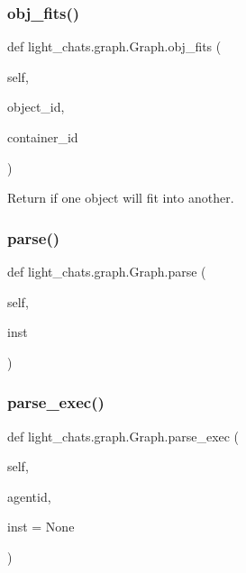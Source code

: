 \subsubsection{\texorpdfstring{obj\+\_\+fits()}{obj\_fits()}}
{\footnotesize\ttfamily def light\+\_\+chats.\+graph.\+Graph.\+obj\+\_\+fits (\begin{DoxyParamCaption}\item[{}]{self,  }\item[{}]{object\+\_\+id,  }\item[{}]{container\+\_\+id }\end{DoxyParamCaption})}

\begin{DoxyVerb}Return if one object will fit into another.
\end{DoxyVerb}
 \mbox{\label{classlight__chats_1_1graph_1_1Graph_a5087252eb40253eacd115e777c092cd8}} 
\subsubsection{\texorpdfstring{parse()}{parse()}}
{\footnotesize\ttfamily def light\+\_\+chats.\+graph.\+Graph.\+parse (\begin{DoxyParamCaption}\item[{}]{self,  }\item[{}]{inst }\end{DoxyParamCaption})}

\mbox{\label{classlight__chats_1_1graph_1_1Graph_a9aede2dd27f6a9ab66f38eaa5f649195}} 
\subsubsection{\texorpdfstring{parse\+\_\+exec()}{parse\_exec()}}
{\footnotesize\ttfamily def light\+\_\+chats.\+graph.\+Graph.\+parse\+\_\+exec (\begin{DoxyParamCaption}\item[{}]{self,  }\item[{}]{agentid,  }\item[{}]{inst = {\ttfamily None} }\end{DoxyParamCaption})}

